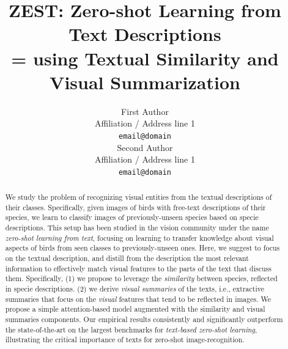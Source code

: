 \documentclass[11pt,a4paper]{article}
\title{ZEST: Zero-shot Learning from Text Descriptions\\ =%
using Textual Similarity and Visual Summarization}
\author{First Author \\
 Affiliation / Address line 1 \\
 \texttt{email@domain} \\\And
 Second Author \\
 Affiliation / Address line 1 \\
 \texttt{email@domain} \\}
\date{}
\begin{document}
\maketitle


\begin{abstract}



We study the problem of recognizing visual entities from the textual descriptions of their classes. Specifically, given images of birds with free-text descriptions of their species, we learn to classify images of previously-unseen species based on specie descriptions. This setup has been studied in the vision community under the name {\em zero-shot learning from text}, focusing on learning to transfer knowledge about visual aspects of birds from seen classes to previously-unseen ones. Here, we suggest to focus on the textual description, 
%
and distill from the description the most relevant information to effectively match visual features to the parts of the text that discuss them. 
Specifically, %
(1) we propose to leverage the {\em similarity} between species, reflected in specie descriptions. 
(2) we derive {\em visual summaries} of the texts, i.e., %
extractive summaries that focus on the {\em visual} features that tend to be reflected in images.
We propose a simple attention-based model augmented with  the similarity and visual summaries components. Our empirical results consistently and significantly outperform the state-of-the-art on the largest benchmarks for {\em text-based zero-shot learning}, illustrating the critical importance of texts for zero-shot image-recognition.




\end{abstract}
\end{document}
